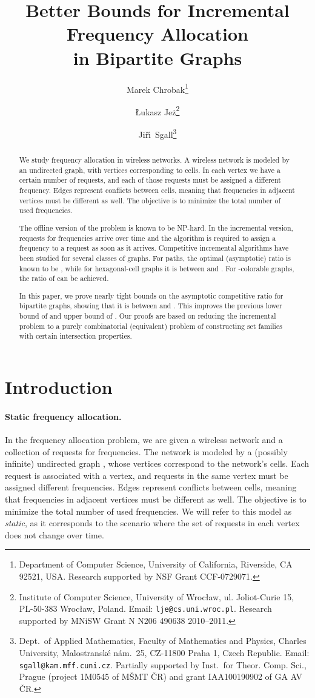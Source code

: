 \documentclass[11pt]{article}
\title{Better Bounds for Incremental Frequency Allocation\\
in Bipartite Graphs}
\author{Marek Chrobak\thanks{Department of Computer Science,
       University of California,
       Riverside, CA 92521, USA.
       Research supported by NSF Grant CCF-0729071.
       }
\and
	{\L}ukasz Je{\.z}\thanks{Institute of Computer Science,
		University of Wroc{\l}aw,
		ul. Joliot-Curie 15, PL-50-383 Wroc{\l}aw, Poland.
		Email: {\tt lje@cs.uni.wroc.pl}.
		Research supported by MNiSW Grant N N206 490638 2010--2011.
	}
\and
		Ji\v{r}\'\i\ Sgall\thanks{Dept.\ of Applied Mathematics, Faculty of Mathematics and Physics,
Charles University, Malostransk\'e n\'am.\ 25, CZ-11800 Praha 1, Czech
Republic. 
Email: {\tt sgall@kam.mff.cuni.cz}.
Partially supported by Inst.\ for Theor. Comp. Sci.,
Prague (project 1M0545 of M\v{S}MT \v{C}R)
and grant IAA100190902 of GA AV \v{C}R.
		}
   }
\newcommand{\NP}{{\textsf{NP}}}
\begin{document}
\maketitle

\begin{abstract}
We study frequency allocation in wireless networks.
A wireless network is modeled by an undirected graph, with vertices
corresponding to cells. In each vertex we have a certain number of
requests, and each of those requests must be assigned a different frequency.
Edges represent conflicts between cells, meaning that frequencies in
adjacent vertices must be different as well. The objective is to
minimize the total number of used frequencies.

The offline version of the problem is known to be {\NP}-hard. In
the incremental version, requests for frequencies arrive over time and 
the algorithm is required to assign a frequency to a request
as soon as it arrives. Competitive incremental algorithms have
been studied for several classes of graphs. For paths,
the optimal (asymptotic) ratio is known to be ,
while for hexagonal-cell graphs it is between  and . 
For -colorable graphs, the ratio of  can be achieved. 

In this paper, we prove nearly tight bounds on the asymptotic
competitive ratio for bipartite graphs, showing that it is between  
and . This improves the previous lower bound of  and upper
bound of .
Our proofs are based on reducing the incremental problem to a purely 
combinatorial (equivalent) problem of 
constructing set families with certain intersection properties.
\end{abstract}




\section{Introduction}
\label{sec: introduction}

\paragraph{Static frequency allocation.}
In the frequency allocation problem, we are given a wireless network
and a collection of requests for frequencies. The network is 
modeled by a (possibly infinite) undirected graph , whose vertices
correspond to the network's cells. Each request is associated with a vertex, 
and requests in the same vertex must be assigned different frequencies.
Edges represent conflicts between cells, meaning that frequencies in
adjacent vertices must be different as well. The objective is to
minimize the total number of used frequencies.
We will refer to this model as \emph{static}, as it
corresponds to the scenario where the set of
requests in each vertex does not change over time.
\end{document}

